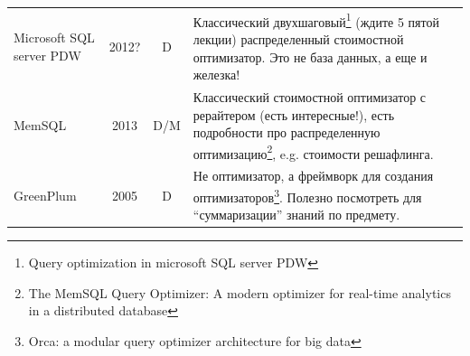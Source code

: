 \documentclass{beamer}
\begin{document}
\begin{frame}[allowframebreaks]
\begin{table}
\begin{longtable}{|p{2cm}|c|c|p{7.2cm}|}
	Microsoft SQL server PDW & 2012? & D & Классический двухшаговый\footnote{Query optimization in microsoft SQL server PDW} (ждите 5 пятой лекции) распределенный стоимостной оптимизатор. Это не база данных, а еще и железка!\\
	
	MemSQL & 2013 & D/M & Классический стоимостной оптимизатор с рерайтером (есть интересные!), есть подробности про распределенную оптимизацию\footnote{The MemSQL Query Optimizer: A modern optimizer for real-time analytics in a distributed database}, e.g. стоимости решафлинга.\\
	
	GreenPlum & 2005 & D & Не оптимизатор, а фреймворк для создания оптимизаторов\footnote{Orca: a modular query optimizer architecture for big data}. Полезно посмотреть для ``суммаризации'' знаний по предмету.\\

	
	
	
	
	
	\hline
\end{longtable}

\end{table}	

\end{frame}
\end{document}
